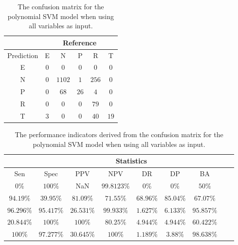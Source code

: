 \begin{table}[!ht]
	\centering
	\begin{tabular}{|c|c|c|c|c|c|}
		\hline
		 & \multicolumn{5}{|c|}{Reference} \\ \hline
		 Prediction & E & N & P & R & T \\ \hline
		 E & $0$ & $0$ & $0$ & $0$ & $0$ \\ \hline
		 N & $0$ & $1102$ & $1$ & $256$ & $0$ \\ \hline
		 P & $0$ & $68$ & $26$ & $4$ & $0$ \\ \hline
		 R & $0$ & $0$ & $0$ & $79$ & $0$ \\ \hline
		 T & $3$ & $0$ & $0$ & $40$ & $19$ \\ \hline
	\end{tabular}
	\caption{The confusion matrix for the polynomial SVM model when using all variables as input.}
	\label{tab:cm:all:svmPoly}
\end{table}

\begin{table}[!ht]
	\centering
	\begin{tabular}{|c|c|c|c|c|c|c|c|c|}
		\hline
		 & \multicolumn{7}{c|}{Statistics} \\ \hline
		Sen & Spec & PPV & NPV & DR & DP & BA \\ \hline
		$0\%$ & $100\%$ & NaN & $99.8123\%$ & $0\%$ & $0\%$ & $50\%$ \\ \hline
		$94.19\%$ & $39.95\%$ & $81.09\%$ & $71.55\%$ & $68.96\%$ & $85.04\%$ & $67.07\%$ \\ \hline
		$96.296\%$ & $95.417\%$ & $26.531\%$ & $99.933\%$ & $1.627\%$ & $6.133\%$ & $95.857\%$ \\ \hline
		$20.844\%$ & $100\%$ & $100\%$ & $80.25\%$ & $4.944\%$ & $4.944\%$ & $60.422\%$ \\ \hline
		$100\%$ & $97.277\%$ & $30.645\%$ & $100\%$ & $1.189\%$ & $3.88\%$ & $98.638\%$ \\ \hline
	\end{tabular}
	\caption{The performance indicators derived from the confusion matrix for the polynomial SVM model when using all variables as input.}
	\label{tab:cs:all:svmPoly}
\end{table}

